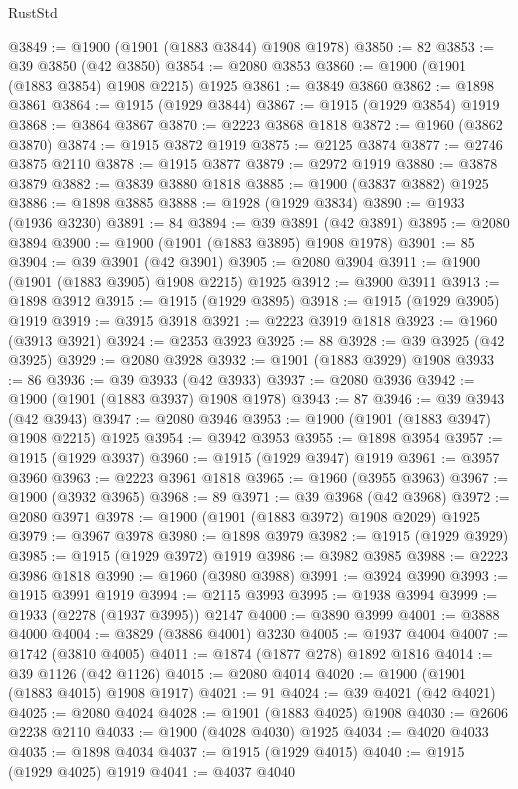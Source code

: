 \begin{lexlean}{RustStd}
\begin{coremodule}
{\begin{coremodule}
{{{{{{{{{{{{{{{{{{{{{{{{{{{{{{{{{{{{{{{{{{{@3849 := @1900 (@1901 (@1883 @3844) @1908 @1978)
@3850 := 82
@3853 := @39 @3850 (@42 @3850)
@3854 := @2080 @3853
@3860 := @1900 (@1901 (@1883 @3854) @1908 @2215) @1925
@3861 := @3849 @3860
@3862 := @1898 @3861
@3864 := @1915 (@1929 @3844)
@3867 := @1915 (@1929 @3854) @1919
@3868 := @3864 @3867
@3870 := @2223 @3868 @1818
@3872 := @1960 (@3862 @3870)
@3874 := @1915 @3872 @1919
@3875 := @2125 @3874
@3877 := @2746 @3875 @2110
@3878 := @1915 @3877
@3879 := @2972 @1919
@3880 := @3878 @3879
@3882 := @3839 @3880 @1818
@3885 := @1900 (@3837 @3882) @1925
@3886 := @1898 @3885
@3888 := @1928 (@1929 @3834)
@3890 := @1933 (@1936 @3230)
@3891 := 84
@3894 := @39 @3891 (@42 @3891)
@3895 := @2080 @3894
@3900 := @1900 (@1901 (@1883 @3895) @1908 @1978)
@3901 := 85
@3904 := @39 @3901 (@42 @3901)
@3905 := @2080 @3904
@3911 := @1900 (@1901 (@1883 @3905) @1908 @2215) @1925
@3912 := @3900 @3911
@3913 := @1898 @3912
@3915 := @1915 (@1929 @3895)
@3918 := @1915 (@1929 @3905) @1919
@3919 := @3915 @3918
@3921 := @2223 @3919 @1818
@3923 := @1960 (@3913 @3921)
@3924 := @2353 @3923
@3925 := 88
@3928 := @39 @3925 (@42 @3925)
@3929 := @2080 @3928
@3932 := @1901 (@1883 @3929) @1908
@3933 := 86
@3936 := @39 @3933 (@42 @3933)
@3937 := @2080 @3936
@3942 := @1900 (@1901 (@1883 @3937) @1908 @1978)
@3943 := 87
@3946 := @39 @3943 (@42 @3943)
@3947 := @2080 @3946
@3953 := @1900 (@1901 (@1883 @3947) @1908 @2215) @1925
@3954 := @3942 @3953
@3955 := @1898 @3954
@3957 := @1915 (@1929 @3937)
@3960 := @1915 (@1929 @3947) @1919
@3961 := @3957 @3960
@3963 := @2223 @3961 @1818
@3965 := @1960 (@3955 @3963)
@3967 := @1900 (@3932 @3965)
@3968 := 89
@3971 := @39 @3968 (@42 @3968)
@3972 := @2080 @3971
@3978 := @1900 (@1901 (@1883 @3972) @1908 @2029) @1925
@3979 := @3967 @3978
@3980 := @1898 @3979
@3982 := @1915 (@1929 @3929)
@3985 := @1915 (@1929 @3972) @1919
@3986 := @3982 @3985
@3988 := @2223 @3986 @1818
@3990 := @1960 (@3980 @3988)
@3991 := @3924 @3990
@3993 := @1915 @3991 @1919
@3994 := @2115 @3993
@3995 := @1938 @3994
@3999 := @1933 (@2278 (@1937 @3995)) @2147
@4000 := @3890 @3999
@4001 := @3888 @4000
@4004 := @3829 (@3886 @4001) @3230
@4005 := @1937 @4004
@4007 := @1742 (@3810 @4005)
@4011 := @1874 (@1877 @278) @1892 @1816
@4014 := @39 @1126 (@42 @1126)
@4015 := @2080 @4014
@4020 := @1900 (@1901 (@1883 @4015) @1908 @1917)
@4021 := 91
@4024 := @39 @4021 (@42 @4021)
@4025 := @2080 @4024
@4028 := @1901 (@1883 @4025) @1908
@4030 := @2606 @2238 @2110
@4033 := @1900 (@4028 @4030) @1925
@4034 := @4020 @4033
@4035 := @1898 @4034
@4037 := @1915 (@1929 @4015)
@4040 := @1915 (@1929 @4025) @1919
@4041 := @4037 @4040
}}}}}}}}}}}}}}}}}}}}}}}}}}}}}}}}}}}}}}}}}}}
\end{coremodule}}
\end{coremodule}
\end{lexlean}
